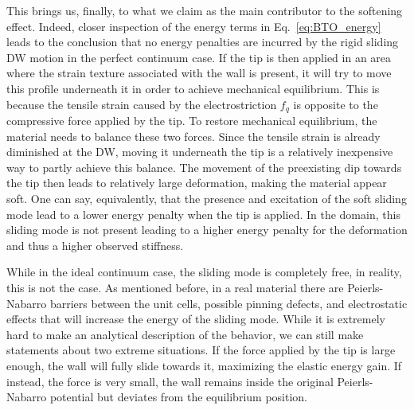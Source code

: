 This brings us, finally, to what we claim as the main contributor to the softening effect.
Indeed, closer inspection of the energy terms in Eq.~\eqref{eq:BTO_energy} leads to the conclusion that no energy penalties are incurred by the rigid sliding \gls{DW} motion in the perfect continuum case.
If the tip is then applied in an area where the strain texture associated with the wall is present, it will try to move this profile underneath it in order to achieve mechanical equilibrium.
This is because the tensile strain caused by the electrostriction $f_q$ is opposite to the compressive force applied by the tip.
To restore mechanical equilibrium, the material needs to balance these two forces.
Since the tensile strain is already diminished at the \gls{DW}, moving it underneath the tip is a relatively inexpensive way to partly achieve this balance.
The movement of the preexisting dip towards the tip then leads to relatively large deformation, making the material appear soft.
One can say, equivalently, that the presence and excitation of the soft sliding mode lead to a lower energy penalty when the tip is applied.
In the domain, this sliding mode is not present leading to a higher energy penalty for the deformation and thus a higher observed stiffness.

While in the ideal continuum case, the sliding mode is completely free, in reality, this is not the case.
As mentioned before, in a real material there are Peierls-Nabarro barriers between the unit cells, possible pinning defects, and electrostatic effects that will increase the energy of the sliding mode.
While it is extremely hard to make an analytical description of the behavior, we can still make statements about two extreme situations.
If the force applied by the tip is large enough, the wall will fully slide towards it, maximizing the elastic energy gain.
If instead, the force is very small, the wall remains inside the original Peierls-Nabarro potential but deviates from the equilibrium position.

